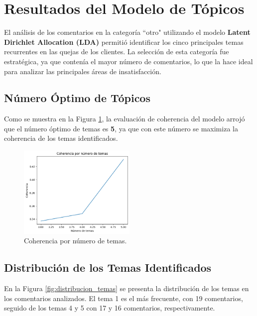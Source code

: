 \documentclass{matematicasud}
\begin{document}
\newpage
\section{Resultados del Modelo de Tópicos}

El análisis de los comentarios en la categoría ``otro" utilizando el modelo \textbf{Latent Dirichlet Allocation (LDA)} permitió identificar los cinco principales temas recurrentes en las quejas de los clientes. La selección de esta categoría fue estratégica, ya que contenía el mayor número de comentarios, lo que la hace ideal para analizar las principales áreas de insatisfacción.

\subsection{Número Óptimo de Tópicos}

Como se muestra en la Figura \ref{fig:coherencia_temas}, la evaluación de coherencia del modelo arrojó que el número óptimo de temas es \textbf{5}, ya que con este número se maximiza la coherencia de los temas identificados.

\begin{figure}[h]
    \centering
    \includegraphics[width=0.5\textwidth]{imagec.png}
    \caption{Coherencia por número de temas.}
    \label{fig:coherencia_temas}
\end{figure}

\subsection{Distribución de los Temas Identificados}

En la Figura \ref{fig:distribucion_temas} se presenta la distribución de los temas en los comentarios analizados. El tema 1 es el más frecuente, con 19 comentarios, seguido de los temas 4 y 5 con 17 y 16 comentarios, respectivamente. 
\end{document}
